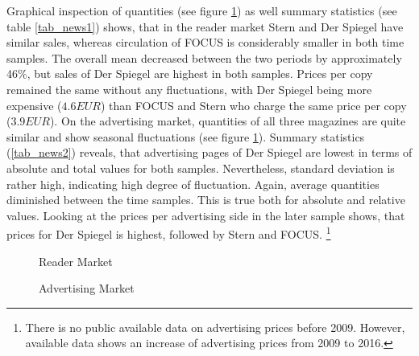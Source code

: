 \documentclass[12pt,a4paper]{scrreprt}
\begin{document}
Graphical inspection of quantities (see figure \ref{fig_circ_fss1}) as well summary statistics (see table \ref{tab_news1}) shows, that in the reader market Stern and Der Spiegel have similar sales, whereas circulation of FOCUS is considerably smaller in both time samples. The overall mean decreased between the two periods by approximately 46$\%$, but sales of Der Spiegel are highest in both samples. Prices per copy remained the same without any fluctuations, with Der Spiegel being more expensive ($4.6 EUR$) than FOCUS and Stern who charge the same price per copy ($3.9 EUR$). On the advertising market, quantities of all three magazines are quite similar and show seasonal fluctuations (see figure \ref{fig_circ_fss1}). Summary statistics (\ref{tab_news2}) reveals, that advertising pages of Der Spiegel are lowest in terms of absolute and total values for both samples. Nevertheless, standard deviation is rather high, indicating high degree of fluctuation. Again, average quantities diminished between the time samples. This is true both for absolute and relative values. Looking at the prices per advertising side in the later sample shows, that prices for Der Spiegel is highest, followed by Stern and FOCUS. \footnote{There is no public available data on advertising prices before 2009. However, available data shows an increase of advertising prices from 2009 to 2016.}

\begin{figure}[H]
\caption{Reader Market}
\begin{minipage}
	\centering
	
\end{minipage}
\hfil
\begin{minipage}
	\centering
	
\end{minipage}
\label{fig_circ_fss1}
\end{figure}

\begin{figure}[H]
\caption{Advertising Market}
\begin{minipage}
	\centering
	
\end{minipage}
\hfil
\begin{minipage}
	\centering
	
\end{minipage}
\label{fig_ads_fss1}
\end{figure}
\end{document}
